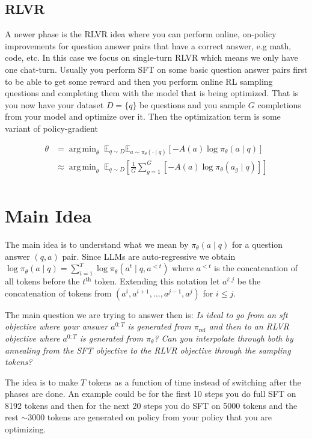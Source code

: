 \documentclass{article}
\DeclareMathOperator*{\argmin}{arg\,min}
\begin{document}
\subsection{RLVR}

A newer phase is the RLVR idea where you can perform online, on-policy improvements for question answer pairs that have a correct answer, e.g math, code, etc. In this case we focus on single-turn RLVR which means we only have one chat-turn. 
Usually you perform SFT on some basic question answer pairs first to be able to get some reward and then you perform online RL sampling questions and completing them with the model that is being optimized. That is you now have your dataset $D = \{ q \}$ be questions and you sample $G$ completions from your model and optimize over it. 
Then the optimization term is some variant of policy-gradient

\begin{align}
\theta &= \argmin_\theta \; \mathbb{E}_{q \sim D} \mathbb{E}_{a \sim \pi_\theta(\cdot \mid q)}
\left[
-A(a) \log \pi_\theta(a \mid q)
\right] \\
&\approx \argmin_\theta \; \mathbb{E}_{q \sim D} \left[ \frac{1}{G}\sum_{g = 1}^G
\left[
-A(a) \log \pi_\theta(a_g \mid q)
\right] \right]\\
\end{align}

\section{Main Idea}

The main idea is to understand what we mean by $\pi_\theta(a \mid q)$ for a question answer $(q,a)$ pair. Since LLMs are auto-regressive we obtain $\log \pi_\theta ( a \mid q) = \sum_{i=1}^T \log \pi_\theta(a^t \mid q, a^{<t})$ where $a^{< t}$ is the concatenation of all tokens before the $t^{\text{th}}$ token. Extending this notation let $a^{i:j}$ be the concatenation of tokens from $(a^i, a^{i+1}, \ldots, a^{j-1}, a^j)$ for $i \leq j$. 

The main question we are trying to answer then is: \textit{Is ideal to go from an sft objective where your answer $a^{0:T}$ is generated from $\pi_{\text{ref}}$ and then to an RLVR objective where $a^{0:T}$ is generated from $\pi_\theta$? Can you interpolate through both by annealing from the SFT objective to the RLVR objective through the sampling tokens?} 

The idea is to make $T$ tokens as a function of time instead of switching after the phases are done. An example could be for the first 10 steps you do full SFT on 8192 tokens and then for the next 20 steps you do SFT on 5000 tokens and the rest $\sim 3000$ tokens are generated on policy from your policy that you are optimizing.
\end{document}
